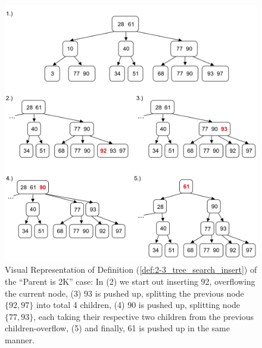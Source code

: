 \begin{figure}[ht!]
    \begin{center}
    \includegraphics[width=\textwidth]{./Sections/graphs/search/2_3_insert_complex.png}
    \end{center}
     \caption{Visual Representation of Definition (\ref{def:2-3_tree_search_insert}) of the ``Parent is 2K'' case: In (2) we start out inserting 92, overflowing the current node,
     (3) 93 is pushed up, splitting the previous node $\{92,97\}$ into total 4 children, 
     (4) 90 is pushed up, splitting node $\{77, 93\}$, each taking their respective two children from the previous children-overflow, (5) and 
     finally, 61 is pushed up in the same manner.
     }\label{fig:2-3_tree_insert_complex}
  \end{figure}
\newpage

